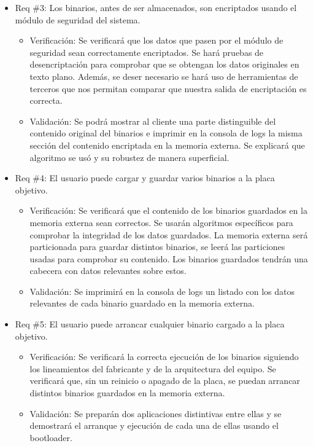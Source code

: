 \documentclass[
11pt, %
]{charter}
\begin{document}
\begin{itemize} 
\item Req \#3: Los binarios, antes de ser almacenados, son encriptados usando el módulo de seguridad del sistema.

\begin{itemize}
	\item Verificación: Se verificará que los datos que pasen por el módulo de seguridad sean correctamente encriptados. Se hará pruebas de desencriptación para comprobar que se obtengan los datos originales en texto plano. Además, se deser necesario se hará uso de herramientas de terceros que nos permitan comparar que nuestra salida de encriptación es correcta. 
	\item Validación: Se podrá mostrar al cliente una parte distinguible del contenido original del binarios e imprimir en la consola de logs la misma sección del contenido encriptada en la memoria externa. Se explicará que algoritmo se usó y su robustez de manera superficial.
\end{itemize}

\end{itemize}

\begin{itemize} 
\item Req \#4: El usuario puede cargar y guardar varios binarios a la placa objetivo.

\begin{itemize}
	\item Verificación: Se verificará que el contenido de los binarios guardados en la memoria externa sean correctos. Se usarán algoritmos específicos para comprobar la integridad de los datos guardados. La memoria externa será particionada para guardar distintos binarios, se leerá las particiones usadas para comprobar su contenido. Los binarios guardados tendrán una cabecera con datos relevantes sobre estos. 
	\item Validación: Se imprimirá en la consola de logs un listado con los datos relevantes de cada binario guardado en la memoria externa.
\end{itemize}

\end{itemize}

\newpage

\begin{itemize} 
\item Req \#5: El usuario puede arrancar cualquier binario cargado a la placa objetivo.

\begin{itemize}
	\item Verificación: Se verificará la correcta ejecución de los binarios siguiendo los lineamientos del fabricante y de la arquitectura del equipo. Se verificará que, sin un reinicio o apagado de la placa, se puedan arrancar distintos binarios guardados en la memoria externa. 
	\item Validación: Se preparán dos aplicaciones distintivas entre ellas y se demostrará el arranque y ejecución de cada una de ellas usando el bootloader.
\end{itemize}

\end{itemize}
\end{document}
